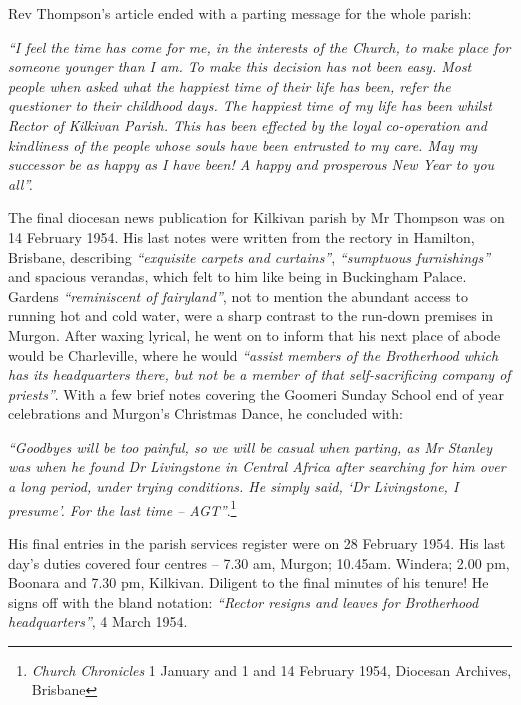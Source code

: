 Rev Thompson's article ended with a parting message for the whole parish:



\emph{``I feel the time has come for me, in the interests of the Church, to make place for someone younger than I am. To make this decision has not been easy. Most people when asked what the happiest time of their life has been, refer the questioner to their childhood days. The happiest time of my life has been whilst Rector of Kilkivan Parish. This has been effected by the loyal co-operation and kindliness of the people whose souls have been entrusted to my care. May my successor be as happy as I have been! A happy and prosperous New Year to you all''.}



The final diocesan news publication for Kilkivan parish by Mr Thompson was on 14 February 1954. His last notes were written from the rectory in Hamilton, Brisbane, describing \emph{``exquisite carpets and curtains''}, \emph{``sumptuous furnishings''} and spacious verandas, which felt to him like being in Buckingham Palace. Gardens \emph{``reminiscent of fairyland''}, not to mention the abundant access to running hot and cold water, were a sharp contrast to the run-down premises in Murgon. After waxing lyrical, he went on to inform that his next place of abode would be Charleville, where he would \emph{``assist members of the Brotherhood which has its headquarters there, but not be a member of that self-sacrificing company of priests''}. With a few brief notes covering the Goomeri Sunday School end of year celebrations and Murgon's Christmas Dance, he concluded with:



\emph{``Goodbyes will be too painful, so we will be casual when parting, as Mr Stanley was when he found Dr Livingstone in Central Africa after searching for him over a long period, under trying conditions. He simply said, `Dr Livingstone, I presume'. For the last time -- AGT''}.\footnote{\emph{Church Chronicles} 1 January and 1 and 14 February 1954, Diocesan Archives, Brisbane}


\smallskip


His final entries in the parish services register were on 28 February 1954. His last day's duties covered four centres -- 7.30 am, Murgon; 10.45am. Windera; 2.00 pm, Boonara and 7.30 pm, Kilkivan. Diligent to the final minutes of his tenure! He signs off with the bland notation: \emph{``Rector resigns and leaves for Brotherhood headquarters''}, 4 March 1954.



